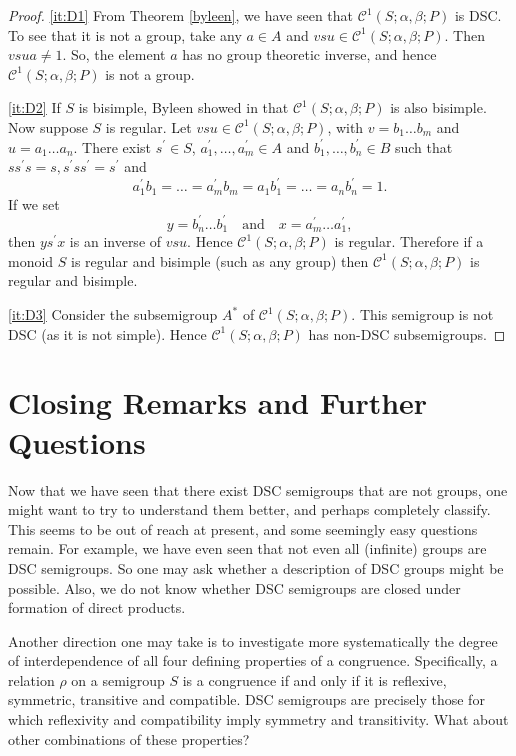 \documentclass[a4paper, 12pt,reqno]{amsart}
\theoremstyle{plain}
\theoremstyle{definition}
\theoremstyle{remark}
\newcommand{\CS}{\mathcal{C}^1(S;\alpha,\beta;P)}
\begin{document}
\begin{proof}
    \ref{it:D1} From Theorem \ref{byleen}, we have seen that $\CS$ is DSC. 
    To see that it is not a group, take any $a \in A$ and $vsu \in \CS$. Then $vsu a \neq 1$.
    So, the element $a$ has no group theoretic inverse, and hence
   $\CS$ is not a group.

   \ref{it:D2}
    If $S$ is bisimple, Byleen showed in \cite{Byleen} that $\CS$ is also bisimple. 
    Now suppose $S$ is regular. Let $vsu \in \CS$, with $v = b_1 \dots b_m$ and $u = a_1 \dots a_n$.
    There exist $s^\prime \in S$, $a_1^\prime , \dots , a_m^\prime \in A$ and $b_1^\prime , \dots , b_n^\prime \in B$ such that $s s^\prime s = s, s^\prime s s^\prime = s^\prime$ and
    \[ 
    a_1^\prime b_1 =  \dots = a_m^\prime b_m=a_1 b_1^\prime = \dots =a_n b_n^\prime =1.
    \] 
    If we set 
    \[
    y = b_n^\prime \dots b_1^\prime \quad\text{and}\quad  x = a_m^\prime \dots a_1^\prime,
    \]
     then $ys^\prime x$ is an inverse of $vsu$.
    Hence $\CS$ is regular.
    Therefore if a monoid $S$ is regular and bisimple (such as any group) then $\CS$ is regular and bisimple.
    
   \ref{it:D3}
    Consider the subsemigroup $A^\ast$ of $\CS$. This semigroup is not DSC (as it is not simple). Hence $\CS$ has non-DSC subsemigroups.
\end{proof}






\section{Closing Remarks and Further Questions}


Now that we have seen that there exist DSC semigroups that are not groups, one might want to try to understand them better, and perhaps completely classify. This seems to be out of reach at present, and some seemingly easy questions remain. For example, we have even seen that not even all (infinite) groups are DSC semigroups. So one may ask whether a description of DSC groups might be possible. Also, we do not know whether DSC semigroups are closed under formation of direct products.

Another direction one may take is to investigate more systematically the degree of interdependence of all four defining properties of a congruence. Specifically, a relation $\rho$ on a semigroup $S$ is a congruence if and only if it is reflexive, symmetric, transitive and compatible. DSC semigroups are precisely those for which reflexivity and compatibility imply symmetry and transitivity. What about other combinations of these properties? 






\end{document}
